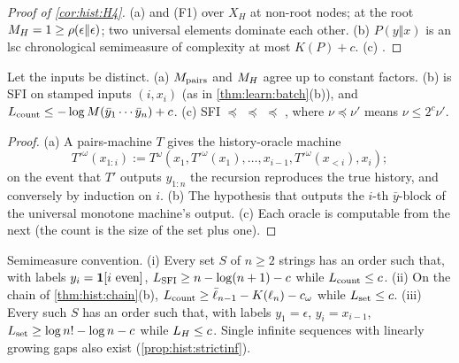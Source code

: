 \begin{proof}[Proof of \cref{cor:hist:H4}]
(a)  and (F1) over $X_H$ at non-root nodes; at the root $M_{H}=1\ge\rho(\epsilon\Vert\epsilon)$; two universal elements dominate each other. (b) $P(y\Vert x)$ is an lsc chronological semimeasure of complexity at most $K(P)+c$. (c) .
\end{proof}

\begin{proposition}\label{prop:hist:variants}
Let the inputs be distinct. (a) $M_{\mathrm{pairs}}$ and $M_{H}$ agree up to constant factors. (b) \SFIcount{} is SFI on stamped inputs $(i,x_i)$ (as in \cref{thm:learn:batch}(b)), and $L_{\rm count}\le-\log M(\bar y_1\cdots\bar y_n)+c$. (c) SFI $\preceq$ \SFIcount{} $\preceq$ \SFIset{} $\preceq$ \SFIhist{}, where $\nu\preceq\nu'$ means $\nu\le2^c\nu'$.
\end{proposition}

\begin{proof}
(a) A pairs-machine $T$ gives the history-oracle machine
\[T'^\omega(x_{1:i}):=T^\omega(x_1,T'^\omega(x_1),\dots,x_{i-1},T'^\omega(x_{<i}),x_i);\]
on the event that $T'$ outputs $y_{1:n}$ the recursion reproduces the true history, and conversely by induction on $i$. (b) The hypothesis that outputs the $i$-th $\bar y$-block of the universal monotone machine's output. (c) Each oracle is computable from the next (the count is the size of the set plus one).
\end{proof}

\begin{proposition}\label{prop:hist:strict}
Semimeasure convention. (i) Every set $S$ of $n\ge2$ strings has an order such that, with labels $y_i=\mathbf{1}[i\text{ even}]$, $L_{\mathrm{SFI}}\ge n-\log(n+1)-c$ while $L_{\rm count}\le c$. (ii) On the chain of \cref{thm:hist:chain}(b), $L_{\rm count}\ge\bar\ell_{n-1}-K(\ell_n)-c_\omega$ while $L_{\rm set}\le c$. (iii) Every such $S$ has an order such that, with labels $y_1=\epsilon$, $y_i=x_{i-1}$, $L_{\rm set}\ge\log n!-\log n-c$ while $L_{H}\le c$. Single infinite sequences with linearly growing gaps also exist (\cref{prop:hist:strictinf}).
\end{proposition}

